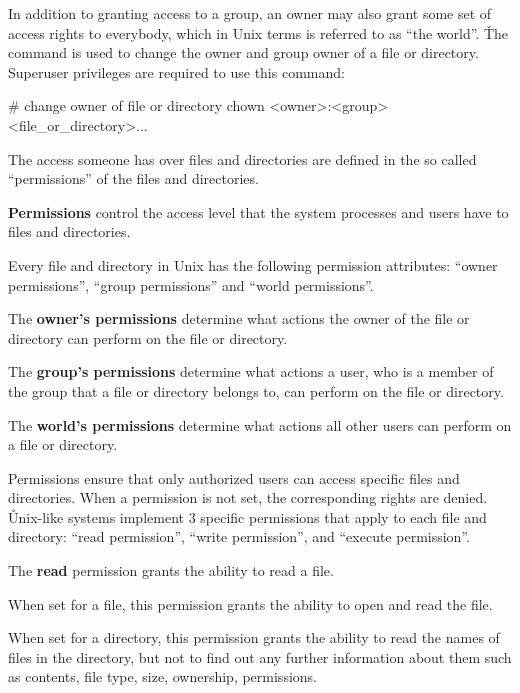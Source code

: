 In addition to granting access to a group, an owner may also grant some set of access rights to everybody, which in
Unix terms is referred to as ``the world''. \v

The  command is used to change the owner and group owner of a file or directory. Superuser privileges are
required to use this command:
\begin{bash}
# change owner of file or directory
chown <owner>:<group> <file_or_directory>...
\end{bash}

The access someone has over files and directories are defined in the so called ``permissions'' of the files and
directories.

\bd[Permissions]
\textbf{Permissions} control the access level that the system processes and users have to files and directories.
\ed

Every file and directory in Unix has the following permission attributes: ``owner permissions'', ``group permissions''
and ``world permissions''.

The \textbf{owner's permissions} determine what actions the owner of the file or directory can perform on the file or
directory.
\ed

The \textbf{group's permissions} determine what actions a user, who is a member of the group that a file or directory
belongs to, can perform on the file or directory.
\ed

The \textbf{world's permissions} determine what actions all other users can perform on a file or directory.
\ed

Permissions ensure that only authorized users can access specific files and directories. When a permission is not set,
the corresponding rights are denied. \v

Unix-like systems implement 3 specific permissions that apply to each file and directory: ``read permission'', ``write
permission'', and ``execute permission''.

The \textbf{read} permission grants the ability to read a file.
\ed

\bit
\item When set for a file, this permission grants the ability to open and read the file.
\item When set for a directory, this permission grants the ability to read the names of files in the directory, but not
to find out any further information about them such as contents, file type, size, ownership, permissions.
\eit

